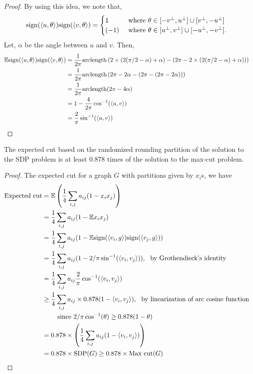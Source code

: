 \documentclass[12pt]{article}
\begin{document}
\begin{proof}
    By using this idea, we note that,
    \begin{equation*}
        \text{sign}(\left\langle u, \theta \right\rangle)\text{sign}(\left\langle v, \theta \right\rangle) = \begin{cases}
            1 & \text{ where } \theta \in [-v^\perp, u^\perp] \cup [v^\perp, -u^\perp]\\
            (-1) & \text{ where } \theta \in [u^\perp, v^\perp] \cup [-u^\perp, -v^\perp].
        \end{cases}
    \end{equation*}
    \noindent Let, $\alpha$ be the angle between $u$ and $v$. Then,
    \begin{align*}
        \mathbb{E}\text{sign}(\left\langle u, \theta \right\rangle)\text{sign}(\left\langle v, \theta \right\rangle) 
        & = \dfrac{1}{2\pi} \text{arclength}\left( 2 \times (2(\pi/2 - \alpha) + \alpha) - (2\pi - 2\times (2(\pi/2 - \alpha) + \alpha)) \right)\\
        & = \dfrac{1}{2\pi} \text{arclength}\left( 2\pi - 2\alpha - (2\pi - (2\pi - 2\alpha)) \right)\\
        & = \dfrac{1}{2\pi}\text{arclength}(2\pi - 4\alpha)\\
        & = 1 - \dfrac{4}{2\pi}\cos^{-1}(\left\langle u, v \right\rangle)\\
        & = \dfrac{2}{\pi}\sin^{-1}(\left\langle u, v \right\rangle)
    \end{align*}
\end{proof}

\begin{theorembox}
    The expected cut based on the randomized rounding partition of the solution to the SDP problem is at least $0.878$ times of the solution to the max-cut problem. 
\end{theorembox}

\begin{proof}
    The expected cut for a graph $G$ with partitions given by $x_i$s, we have 
    \begin{align*}
        \text{Expected cut} 
        & = \mathbb{E}\left( \dfrac{1}{4} \sum_{i,j}a_{ij}(1 - x_i x_j) \right)\\
        & = \dfrac{1}{4}\sum_{i,j}a_{ij}(1 - \mathbb{E} x_i x_j)\\
        & = \dfrac{1}{4}\sum_{i,j} a_{ij}(1 - \mathbb{E}\text{sign}(\left\langle v_i, g \right\rangle)\text{sign}(\left\langle v_j, g \right\rangle))\\
        & = \dfrac{1}{4}\sum_{i,j}a_{ij}(1 - 2/\pi \sin^{-1}(\left\langle v_i, v_j \right\rangle)), \ \text{ by Grothendieck's identity}\\
        & = \dfrac{1}{4}\sum_{i,j} a_{ij} \dfrac{2}{\pi} \cos^{-1}(\left\langle v_i, v_j \right\rangle)\\
        & \geq \dfrac{1}{4}\sum_{i,j} a_{ij} \times 0.878 (1 - \left\langle v_i, v_j \right\rangle), \ \text{ by linearization of arc cosine function}\\
        & \qquad \text{ since } 2/\pi\cos^{-1}(\theta) \geq 0.878(1- \theta)\\
        & = 0.878 \times \left( \dfrac{1}{4}\sum_{i,j}a_{ij}(1 - \left\langle v_i, v_j \right\rangle) \right)\\
        & = 0.878 \times \text{SDP}(G) \geq 0.878 \times \text{Max cut}(G)
    \end{align*}
\end{proof}
\end{document}
